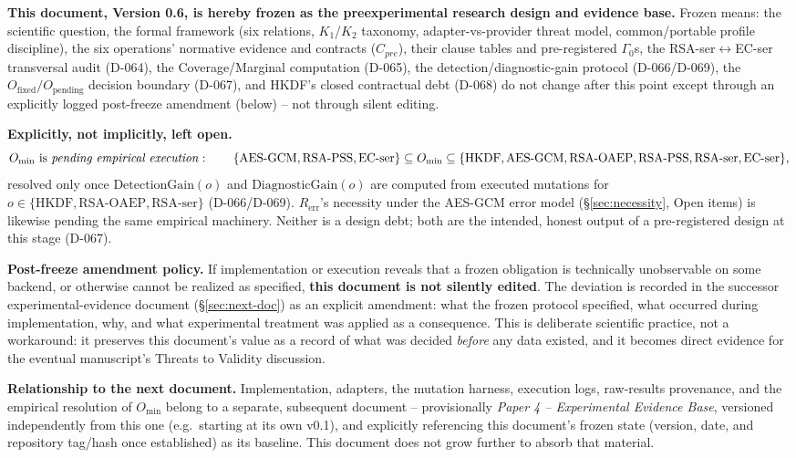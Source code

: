 \documentclass[11pt,a4paper]{article}
\begin{document}
\textbf{This document, Version 0.6, is hereby frozen as the preexperimental research design and evidence base.} Frozen means: the scientific question, the formal framework (six relations, $K_1$/$K_2$ taxonomy, adapter-vs-provider threat model, common/portable profile discipline), the six operations' normative evidence and contracts ($C_{pre}$), their clause tables and pre-registered $\Gamma_0$s, the RSA-ser$\leftrightarrow$EC-ser transversal audit (D-064), the Coverage/Marginal computation (D-065), the detection/diagnostic-gain protocol (D-066/D-069), the $O_{\text{fixed}}/O_{\text{pending}}$ decision boundary (D-067), and HKDF's closed contractual debt (D-068) do not change after this point except through an explicitly logged post-freeze amendment (below) -- not through silent editing.

\textbf{Explicitly, not implicitly, left open.}
\[
O_{\min} \text{ is \emph{pending empirical execution}}: \qquad \{\text{AES-GCM},\text{RSA-PSS},\text{EC-ser}\} \subseteq O_{\min} \subseteq \{\text{HKDF},\text{AES-GCM},\text{RSA-OAEP},\text{RSA-PSS},\text{RSA-ser},\text{EC-ser}\},
\]
resolved only once $\text{DetectionGain}(o)$ and $\text{DiagnosticGain}(o)$ are computed from executed mutations for $o\in\{\text{HKDF},\text{RSA-OAEP},\text{RSA-ser}\}$ (D-066/D-069). $R_{\text{err}}$'s necessity under the AES-GCM error model (\S\ref{sec:necessity}, Open items) is likewise pending the same empirical machinery. Neither is a design debt; both are the intended, honest output of a pre-registered design at this stage (D-067).

\textbf{Post-freeze amendment policy.} If implementation or execution reveals that a frozen obligation is technically unobservable on some backend, or otherwise cannot be realized as specified, \textbf{this document is not silently edited}. The deviation is recorded in the successor experimental-evidence document (\S\ref{sec:next-doc}) as an explicit amendment: what the frozen protocol specified, what occurred during implementation, why, and what experimental treatment was applied as a consequence. This is deliberate scientific practice, not a workaround: it preserves this document's value as a record of what was decided \emph{before} any data existed, and it becomes direct evidence for the eventual manuscript's Threats to Validity discussion.

\textbf{Relationship to the next document.}\label{sec:next-doc} Implementation, adapters, the mutation harness, execution logs, raw-results provenance, and the empirical resolution of $O_{\min}$ belong to a separate, subsequent document -- provisionally \emph{Paper 4 -- Experimental Evidence Base}, versioned independently from this one (e.g.\ starting at its own v0.1), and explicitly referencing this document's frozen state (version, date, and repository tag/hash once established) as its baseline. This document does not grow further to absorb that material.
\end{document}
